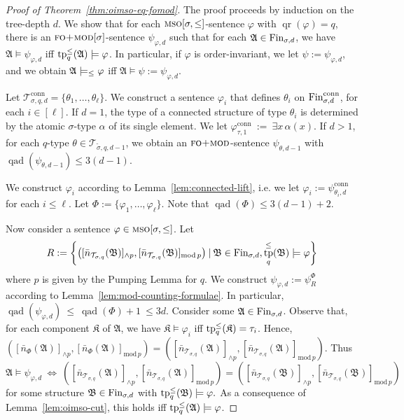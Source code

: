 \documentclass[11pt]{article}
\renewcommand{\phi}{\varphi}
\newcommand{\fin}{\textup{Fin}}
\newcommand{\conn}{\text{conn}}
\newcommand{\logic}[1]{\textsc{#1}}
\newcommand{\FOmod}{\logic{fo+mod}}
\newcommand{\MSO}{\logic{mso}}
\newcommand{\types}[1][\sigma,q,d]{\mathcal{T}_{#1}}
\newcommand{\ctypes}[1][\sigma,q,d]{\mathcal{T}^{\conn}_{#1}}
\newcommand{\redmax}[2]{[#1]_{{\wedge}#2}}
\newcommand{\redmod}[2]{[#1]_{\mathrm{mod}\,#2}}
\newcommand{\qr}[1]{\operatorname{qr}(#1)}
\newcommand{\qad}[1]{\operatorname{qad}(#1)}
\newcommand{\st}{\mathbin |}
\newcommand{\leqsym}{\logic{\ensuremath{\leq}}}
\DeclareMathOperator{\tp}{tp}
\newcommand{\struct}[1]{\mathfrak{#1}}
\newcommand{\AS}{\struct{A}}
\newcommand{\BS}{\struct{B}}
\newcommand{\KS}{\struct{K}}
\newcommand{\set}[1]{\{#1\}}
\newcommand{\lrsetc}[2]{\left\{#1 \st #2\right\}}
\begin{document}
\begin{proof}[Proof of Theorem~\ref{thm:oimso-eq-fomod}]
  The proof proceeds by induction on the tree-depth $d$.  We show that for each
  $\MSO[\sigma,\leqsym]$-sentence $\phi$ with $\qr{\phi} = q$, there is an
  $\FOmod[\sigma]$-sentence $\psi_{\phi,d}$ such that for each $\AS\in
  \fin_{\sigma,d}$, we have $\AS\models \psi_{\phi,d}$ iff
  $\tp^\leqsym_q(\AS)\models \phi$.  In particular, if $\phi$ is order-invariant,
  we let $\psi := \psi_{\phi,d}$, and we obtain $\AS \models_{\leqsym} \phi$ iff
  $\AS \models \psi := \psi_{\phi,d}$.
  
  Let $\ctypes[\sigma, q, d]=\set{\theta_{1}, \ldots, \theta_{\ell}}$.  We
  construct a sentence $\phi_i$ that defines $\theta_i$ on
  $\fin^\conn_{\sigma,d}$, for each $i\in [\ell]$. If $d=1$, the type of a
  connected structure of type $\theta_i$ is determined by the atomic $\sigma$-type
  $\alpha$ of its single element. We let $\phi^{\conn}_{\tau,1} \ := \ \exists x\,
  \alpha(x)$.  If $d>1$, for each $q$-type $\theta\in\types[\tilde \sigma, q,
  d-1]$, we obtain an $\FOmod$-sentence $\psi_{\theta,d-1}$ with
  $\qad{\psi_{\theta,d-1}} \leq 3(d-1)$.
  
  We construct $\phi_i$ according to Lemma~\ref{lem:connected-lift},
  i.e. we let $\phi_i:=\psi^{\conn}_{\theta_i,d}$ for each $i\leq
  \ell$. Let $\Phi := \set{\phi_1, \ldots, \phi_\ell}$.
  Note that $\qad{\Phi} \leq 3(d-1)+2$. 

  Now consider a sentence $\phi\in\MSO[\sigma,\leqsym]$.
  Let
  \[ R:=\lrsetc{\left(\redmax{\bar{n}_{\types[\sigma,q]}(\BS)}{p},
    \redmod{\bar{n}_{\types[\sigma,q]}(\BS)}{p}\right)}{\BS \in \fin_{\sigma,d},\tp^\leqsym_q(\BS) \models\phi} \] 
  where $p$ is given by the Pumping Lemma for $q$.
  We construct $\psi_{\phi,d}:=\psi^{\Phi}_{R}$ according to Lemma~\ref{lem:mod-counting-formulae}.
  In particular, $\qad{\psi_{\phi,d}} \ \leq \ \qad{\Phi} + 1 \ \leq 3d$.
  Consider some $\AS\in \fin_{\sigma,d}$.
  Observe that, for each component $\KS$ of $\AS$, we have $\KS \models \phi_{i}$ iff $\tp^\leqsym_q(\KS)=\tau_i$. Hence,
  $(\redmax{\bar{n}_{\Phi}(\AS)}{p},\redmod{\bar{n}_{\Phi}(\AS)}{p}) = (\redmax{\bar{n}_{\types[\sigma,q]}(\AS)}{p},\redmod{\bar{n}_{\types[\sigma,q]}(\AS)}{p})$.
  Thus
  \[ \AS \models \psi_{\phi,d} \ \iff \ (\redmax{\bar{n}_{\types[\sigma,q]}(\AS)}{p},\redmod{\bar{n}_{\types[\sigma,q]}(\AS)}{p}) = (\redmax{\bar{n}_{\types[\sigma,q]}(\BS)}{p},\redmod{\bar{n}_{\types[\sigma,q]}(\BS)}{p}) \] for some structure $\BS\in \fin_{\sigma,d}$ with $\tp^\leqsym_q(\BS)\models \phi.$
  As a consequence of Lemma~\ref{lem:oimso-cut}, this holds iff
  $\tp^\leqsym_q(\AS)\models \phi$.
\end{proof}
\end{document}
